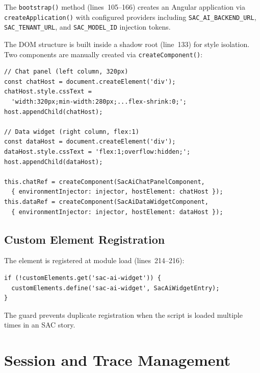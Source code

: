 \documentclass[11pt]{article}
\begin{document}
The \texttt{bootstrap()} method (lines~105--166) creates an Angular application
via \texttt{createApplication()} with configured providers including
\texttt{SAC\_AI\_BACKEND\_URL}, \texttt{SAC\_TENANT\_URL}, and
\texttt{SAC\_MODEL\_ID} injection tokens.

The DOM structure is built inside a shadow root (line~133) for style isolation.
Two components are manually created via \texttt{createComponent()}:

\begin{lstlisting}[language={[Sharp]C},caption={Two-column layout (sac-ai-widget.entry.ts:140--161)}]
// Chat panel (left column, 320px)
const chatHost = document.createElement('div');
chatHost.style.cssText =
  'width:320px;min-width:280px;...flex-shrink:0;';
host.appendChild(chatHost);

// Data widget (right column, flex:1)
const dataHost = document.createElement('div');
dataHost.style.cssText = 'flex:1;overflow:hidden;';
host.appendChild(dataHost);

this.chatRef = createComponent(SacAiChatPanelComponent,
  { environmentInjector: injector, hostElement: chatHost });
this.dataRef = createComponent(SacAiDataWidgetComponent,
  { environmentInjector: injector, hostElement: dataHost });
\end{lstlisting}

\subsection{Custom Element Registration}

The element is registered at module load (lines~214--216):

\begin{lstlisting}[language={[Sharp]C},caption={Custom element registration (sac-ai-widget.entry.ts:214--216)}]
if (!customElements.get('sac-ai-widget')) {
  customElements.define('sac-ai-widget', SacAiWidgetEntry);
}
\end{lstlisting}

\noindent The guard prevents duplicate registration when the script is loaded
multiple times in an SAC story.

\section{Session and Trace Management}
\label{sec:session}
\end{document}
